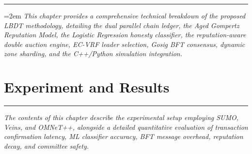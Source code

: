 \documentclass[12pt,phd,times]{pkmthesis}
\begin{document}
\noindent \rule{\textwidth}{0.01in}

{\emergencystretch=2em
\emph{This chapter provides a comprehensive technical breakdown of the proposed LBDT methodology, detailing the dual parallel chain ledger, the Aged Gompertz Reputation Model, the Logistic Regression honesty classifier, the reputation-aware double auction engine, EC-VRF leader selection, Gosig BFT consensus, dynamic zone sharding, and the C++/Python simulation integration.}
}

\label{chap:methodology}


\chapter{Experiment and Results}
\vspace{-1cm}
\noindent \rule{\textwidth}{0.01in}
\emph{The contents of this chapter describe the experimental setup employing SUMO, Veins, and OMNeT++, alongside a detailed quantitative evaluation of transaction confirmation latency, ML classifier accuracy, BFT message overhead, reputation decay, and committee safety.}
\label{chap:results}
\end{document}
